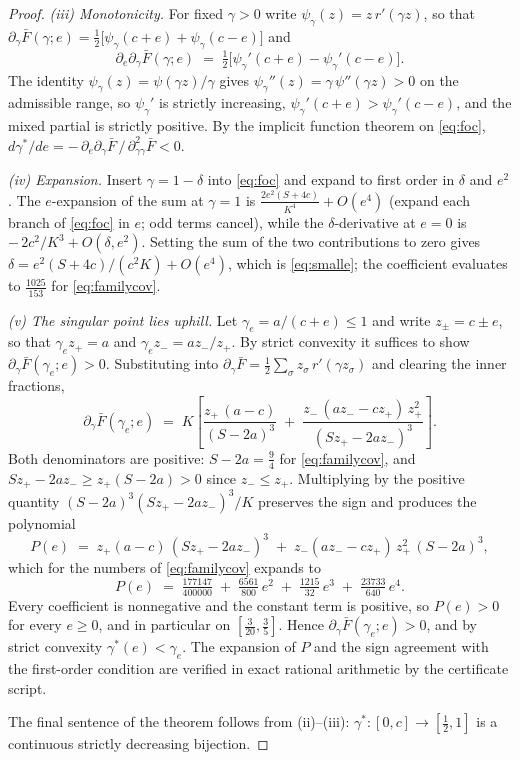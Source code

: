 \documentclass[11pt]{article}
\theoremstyle{remark}
\begin{document}
\begin{proof}
\emph{(iii) Monotonicity.} For fixed $\gamma > 0$ write
$\psi_\gamma(z) = z\, r'(\gamma z)$, so that
$\partial_\gamma \bar F(\gamma; e) =
\tfrac12\big[\psi_\gamma(c+e) + \psi_\gamma(c-e)\big]$ and
\[
  \partial_e \partial_\gamma \bar F(\gamma; e) \;=\;
  \tfrac{1}{2}\big[\psi_\gamma'(c+e) - \psi_\gamma'(c-e)\big].
\]
The identity $\psi_\gamma(z) = \psi(\gamma z)/\gamma$ gives
$\psi_\gamma''(z) = \gamma\, \psi''(\gamma z) > 0$ on the admissible range,
so $\psi_\gamma'$ is strictly increasing,
$\psi_\gamma'(c+e) > \psi_\gamma'(c-e)$, and the mixed partial is strictly
positive. By the implicit function theorem on \eqref{eq:foc},
$d\gamma^*/de = -\,\partial_e\partial_\gamma \bar F \,/\,
\partial^2_{\gamma\gamma}\bar F < 0$.

\emph{(iv) Expansion.} Insert $\gamma = 1 - \delta$ into \eqref{eq:foc} and
expand to first order in $\delta$ and $e^2$. The $e$-expansion of the sum at
$\gamma = 1$ is
$\tfrac{2 e^2 (S + 4c)}{K^4} + O(e^4)$ (expand each branch of
\eqref{eq:foc} in $e$; odd terms cancel), while the $\delta$-derivative at
$e = 0$ is $-\,2c^2/K^3 + O(\delta, e^2)$. Setting the sum of the two
contributions to zero gives $\delta = e^2 (S + 4c)/(c^2 K) + O(e^4)$, which
is \eqref{eq:smalle}; the coefficient evaluates to
$\tfrac{1025}{153}$ for \eqref{eq:familycov}.

\emph{(v) The singular point lies uphill.} Let
$\gamma_e = a/(c+e) \le 1$ and write $z_\pm = c \pm e$, so that
$\gamma_e z_+ = a$ and $\gamma_e z_- = a z_-/z_+$. By strict convexity it
suffices to show $\partial_\gamma \bar F(\gamma_e; e) > 0$. Substituting
into $\partial_\gamma \bar F = \tfrac12\sum_\sigma z_\sigma\,
r'(\gamma z_\sigma)$ and clearing the inner fractions,
\[
  \partial_\gamma \bar F(\gamma_e; e)
  \;=\; K\left[\frac{z_+\,(a-c)}{(S-2a)^3}
  \;+\; \frac{z_-\,(a z_- - c z_+)\, z_+^2}{(S z_+ - 2a z_-)^3}\right].
\]
Both denominators are positive: $S - 2a = \tfrac94$ for
\eqref{eq:familycov}, and
$S z_+ - 2a z_- \ge z_+ (S - 2a) > 0$ since $z_- \le z_+$. Multiplying by
the positive quantity $(S-2a)^3 (S z_+ - 2a z_-)^3 / K$ preserves the sign
and produces the polynomial
\[
  P(e) \;=\; z_+ (a-c)\,(S z_+ - 2a z_-)^3
  \;+\; z_- (a z_- - c z_+)\, z_+^2\, (S - 2a)^3,
\]
which for the numbers of \eqref{eq:familycov} expands to
\[
  P(e) \;=\; \tfrac{177147}{400000} \;+\; \tfrac{6561}{800}\, e^2
  \;+\; \tfrac{1215}{32}\, e^3 \;+\; \tfrac{23733}{640}\, e^4 .
\]
Every coefficient is nonnegative and the constant term is positive, so
$P(e) > 0$ for every $e \ge 0$, and in particular on
$[\tfrac{3}{20}, \tfrac35]$. Hence
$\partial_\gamma \bar F(\gamma_e; e) > 0$, and by strict convexity
$\gamma^*(e) < \gamma_e$. The expansion of $P$ and the sign agreement with
the first-order condition are verified in exact rational arithmetic by the
certificate script.

The final sentence of the theorem follows
from (ii)--(iii): $\gamma^* : [0, c] \to [\tfrac12, 1]$ is a continuous
strictly decreasing bijection.
\end{proof}
\end{document}
